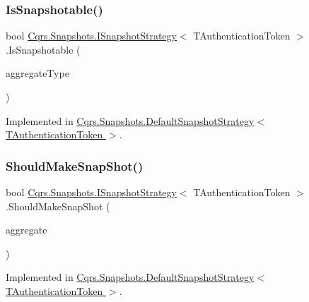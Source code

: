 \subsubsection{\texorpdfstring{Is\+Snapshotable()}{IsSnapshotable()}}
{\footnotesize\ttfamily bool \hyperlink{interfaceCqrs_1_1Snapshots_1_1ISnapshotStrategy}{Cqrs.\+Snapshots.\+I\+Snapshot\+Strategy}$<$ T\+Authentication\+Token $>$.Is\+Snapshotable (\begin{DoxyParamCaption}\item[{Type}]{aggregate\+Type }\end{DoxyParamCaption})}



Implemented in \hyperlink{classCqrs_1_1Snapshots_1_1DefaultSnapshotStrategy_aea1e973d654aaee6f620543be7343fda_aea1e973d654aaee6f620543be7343fda}{Cqrs.\+Snapshots.\+Default\+Snapshot\+Strategy$<$ T\+Authentication\+Token $>$}.

\mbox{\label{interfaceCqrs_1_1Snapshots_1_1ISnapshotStrategy_ab1d54cd76c7ac832329cb3a6de0effcd_ab1d54cd76c7ac832329cb3a6de0effcd}} 
\subsubsection{\texorpdfstring{Should\+Make\+Snap\+Shot()}{ShouldMakeSnapShot()}}
{\footnotesize\ttfamily bool \hyperlink{interfaceCqrs_1_1Snapshots_1_1ISnapshotStrategy}{Cqrs.\+Snapshots.\+I\+Snapshot\+Strategy}$<$ T\+Authentication\+Token $>$.Should\+Make\+Snap\+Shot (\begin{DoxyParamCaption}\item[{\hyperlink{interfaceCqrs_1_1Domain_1_1IAggregateRoot}{I\+Aggregate\+Root}$<$ T\+Authentication\+Token $>$}]{aggregate }\end{DoxyParamCaption})}



Implemented in \hyperlink{classCqrs_1_1Snapshots_1_1DefaultSnapshotStrategy_a59ee11e5c488a40933685e232661df39_a59ee11e5c488a40933685e232661df39}{Cqrs.\+Snapshots.\+Default\+Snapshot\+Strategy$<$ T\+Authentication\+Token $>$}.

